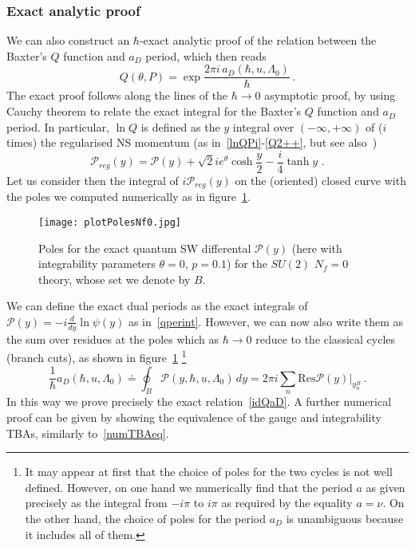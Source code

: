 \documentclass[11pt,a4paper]{elsarticle}
\def \th {\theta}
\def \CP {\mathcal{P}}
\newcommand{\be}{\begin{equation}}
\newcommand{\ee}{\end{equation}}
\def\th{\theta}
\numberwithin{figure}{section}
\numberwithin{table}{section}
\begin{document}
\subsubsection{Exact analytic proof}

We can also construct an $\hbar$-exact analytic proof of the relation between the Baxter's $Q$ function and $a_D$ period, which then reads
\be
\label{idQaD}
Q(\th,P) = \exp  \frac{2 \pi i \,a_D(\hbar ,u,\Lambda_0)}{\hbar}\,.
\ee 
The exact proof follows along the lines of the $\hbar \to 0$ asymptotic proof, by using Cauchy theorem to relate the exact integral for the Baxter's $Q$ function and $a_D$ period. In particular, $\ln Q$ is defined as the $y$ integral over $(-\infty,+\infty)$ of ($i$ times) the regularised NS momentum (as in~\eqref{lnQPi}-\eqref{Q2++}, but see also~\cite{FioravantiGregori:2019})
\be
\CP_{reg}(y)= \CP(y) +\sqrt{2} i e^{\theta}\cosh \frac{y}{2} - \frac{i}{4} \tanh y \,\, .
\label{Preg'}
\ee 
Let us consider then the integral of $i \CP_{reg}(y)$ on the (oriented) closed curve with the poles we computed numerically as in figure~\ref{fig:polesNf=0}.
 \begin{figure}[t]
 \centering
 \texttt{[image: plotPolesNf0.jpg]}
 \caption{Poles for the exact quantum SW differental $\mathcal{P}(y)$ (here with integrability parameters  $\theta = 0$, $p=0.1$) for the $SU(2)$ $N_f=0$ theory, whose set we denote by $B$.}\label{fig:polesNf=0}
 \end{figure}
We can define the exact dual periods as the exact integrals of $\mathcal{P}(y) = - i \frac{d}{dy} \ln \psi(y) $ as in~\eqref{qperint}. However, we can now also write them as the sum over residues at the poles which as $\hbar\to 0$ reduce to the classical cycles (branch cuts), as shown in figure~\ref{fig:polesNf=0} \footnote{It may appear at first that the choice of poles for the two cycles is not well defined. However, on one hand we numerically find that the period $a$ as given precisely as the integral from $-i \pi$ to $i\pi$ as required by the equality $a= \nu$. On the other hand, the choice of poles for the period $a_D$ is unambiguous because it includes all of them.}
\begin{equation}
 \frac{1}{\hbar}a_D(\hbar,u,\Lambda_0) \doteq \oint_{B} \mathcal{P}( y,\hbar,u,\Lambda_0)\, d y =2\pi i\sum_{n}\text{Res}\mathcal{P}(y)\biggr |_{y_n^{B}} \,.
 \end{equation}
In this way we prove precisely the exact relation~\eqref{idQaD}. A further numerical proof can be given by showing the equivalence of the gauge and integrability TBAs, similarly to~\eqref{numTBAeq}.
\end{document}

